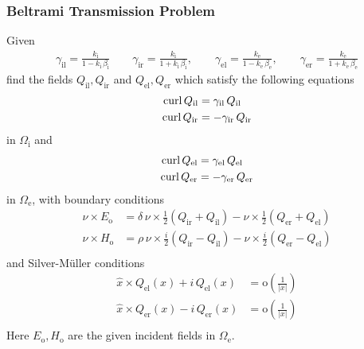 \subsubsection{Beltrami Transmission Problem}
Given
\begin{align}
  \gamma_\text{il} = \frac{k_\text{i}}{1-k_\text{i}\,\beta_\text{i}}\qquad\gamma_\text{ir} = \frac{k_\text{i}}{1+k_\text{i}\,\beta_\text{i}},\qquad\gamma_\text{el} = \frac{k_\text{e}}{1-k_\text{e}\,\beta_\text{e}},\qquad\gamma_\text{er} = \frac{k_\text{e}}{1+k_\text{e}\,\beta_\text{e}}
\end{align}
find the fields $Q_\text{il}, Q_\text{ir}$ and $Q_\text{el}, Q_\text{er}$ which satisfy the following equations
\begin{equation}
\begin{split}
  \operatorname{curl} Q_\text{il} &= \gamma_\text{il}\,Q_\text{il} \\
  \operatorname{curl} Q_\text{ir} &= -\gamma_\text{ir}\,Q_\text{ir} \\
\end{split}
\end{equation}
in $\Omega_\text{i}$ and
\begin{equation}
\begin{split}
  \operatorname{curl} Q_\text{el} &= \gamma_\text{el}\,Q_\text{el} \\
  \operatorname{curl} Q_\text{er} &= -\gamma_\text{er}\,Q_\text{er} \\
\end{split}
\end{equation}
in $\Omega_\text{e}$, with boundary conditions
\begin{equation}
\begin{split}
  \nu\times E_\text{o} &= \delta\,\nu\times \frac{1}{2}\left(Q_\text{ir} + Q_\text{il}\right) - \nu\times \frac{1}{2}\left(Q_\text{er} + Q_\text{el}\right)\\
  \nu\times H_\text{o} &= \rho\,\nu\times\frac{i}{2}\left(Q_\text{ir} - Q_\text{il}\right) - \nu\times\frac{i}{2}\left(Q_\text{er} - Q_\text{el}\right) \\
\end{split}
\end{equation}
and Silver-M\"uller conditions
\begin{equation}
\begin{split}
  \hat{x}\times Q_\text{el}(x) + i\,Q_\text{el}(x) &= \text{o}\left(\frac{1}{|x|}\right) \\
  \hat{x}\times Q_\text{er}(x) - i\,Q_\text{er}(x) &= \text{o}\left(\frac{1}{|x|}\right) \\
\end{split}
\end{equation}
Here $E_\text{o}, H_\text{o}$ are the given incident fields in $\Omega_\text{e}$.

